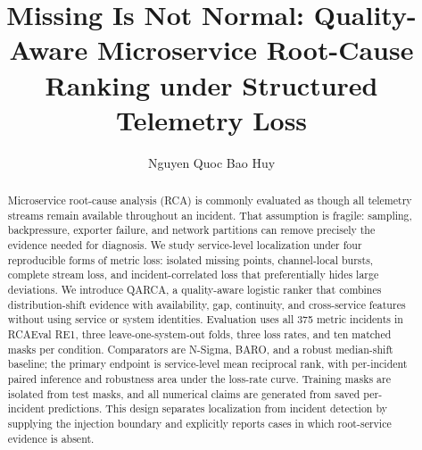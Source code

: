 \documentclass[runningheads]{llncs}
\newif\ifanonymous
\begin{document}
\title{Missing Is Not Normal: Quality-Aware Microservice Root-Cause
Ranking under Structured Telemetry Loss}

\ifanonymous
  \author{Anonymous Author(s)}
  \authorrunning{Anonymous Author(s)}
  \institute{Anonymous Institution(s)}
\else
  \author{Nguyen Quoc Bao Huy}
\fi

\maketitle

\begin{abstract}
Microservice root-cause analysis (RCA) is commonly evaluated as though all
telemetry streams remain available throughout an incident. That assumption is
fragile: sampling, backpressure, exporter failure, and network partitions can
remove precisely the evidence needed for diagnosis. We study service-level
localization under four reproducible forms of metric loss: isolated missing
points, channel-local bursts, complete stream loss, and incident-correlated loss
that preferentially hides large deviations. We introduce QARCA, a
quality-aware logistic ranker that combines distribution-shift evidence with
availability, gap, continuity, and cross-service features without using service
or system identities. Evaluation uses all 375 metric incidents in RCAEval RE1,
three leave-one-system-out folds, three loss rates, and ten matched masks per
condition. Comparators are N-Sigma, BARO, and a robust median-shift baseline;
the primary endpoint is service-level mean reciprocal rank, with per-incident
paired inference and robustness area under the loss-rate curve. Training masks
are isolated from test masks, and all numerical claims are generated from saved
per-incident predictions. This design separates localization from incident
detection by supplying the injection boundary and explicitly reports cases in
which root-service evidence is absent.

\end{abstract}
\end{document}
